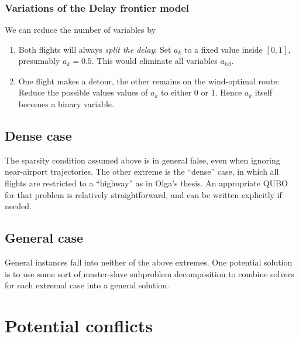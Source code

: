 \documentclass{article}
\begin{document}
\subsubsection{Variations of the Delay frontier model}
We can reduce the number of variables by
\begin{enumerate}
    \item Both flights will always \textit{split the delay}: Set $a_k$ to a fixed value inside $[0, 1]$, presumably $a_k = 0.5$. This would eliminate all variables $a_{k\beta}$.
    \item One flight makes a detour, the other remains on the wind-optimal route: Reduce the possible values values of $a_k$ to either $0$ or $1$. Hence $a_k$ itself becomes a binary variable.
\end{enumerate}

\subsection{Dense case}
The sparsity condition assumed above is in general false, even when ignoring near-airport trajectories.
The other extreme is the ``dense'' case, in which all flights are restricted to a ``highway'' as in Olga's thesis.
An appropriate QUBO for that problem is relatively straightforward, and can be written explicitly if needed.

\subsection{General case}
General instances fall into neither of the above extremes.
One potential solution is to use some sort of master-slave subproblem decomposition to combine solvers for each extremal case into a general solution.


\newpage
\appendix
\section{Potential conflicts}
\label{app:potential_conflicts}
\end{document}
